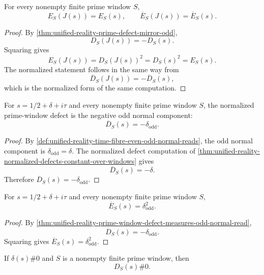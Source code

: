 \begin{theorem}
\label{thm:unified-reality-defect-energy-mirror-even}
For every nonempty finite prime window $S$,
$$
E_S(J(s))=E_S(s),
\qquad
\overline E_S(J(s))=\overline E_S(s).
$$
\end{theorem}

\begin{proof}
By \autoref{thm:unified-reality-prime-defect-mirror-odd},
$$
D_S(J(s))=-D_S(s).
$$
Squaring gives
$$
E_S(J(s))=D_S(J(s))^2=D_S(s)^2=E_S(s).
$$
The normalized statement follows in the same way from
$$
\overline D_S(J(s))=-\overline D_S(s),
$$
which is the normalized form of the same computation.
\end{proof}

\begin{theorem}
\label{thm:unified-reality-prime-window-defect-measures-odd-normal-read}
For $s=1/2+\delta+i\tau$ and every nonempty finite prime window $S$,
the normalized prime-window defect is the negative odd normal component:
$$
\overline D_S(s)=-\delta_{\mathrm{odd}}.
$$
\end{theorem}

\begin{proof}
By
\autoref{def:unified-reality-time-fibre-even-odd-normal-reads}, the odd
normal component is $\delta_{\mathrm{odd}}=\delta$.  The normalized
defect computation of
\autoref{thm:unified-reality-normalized-defects-constant-over-windows}
gives
$$
\overline D_S(s)=-\delta.
$$
Therefore $\overline D_S(s)=-\delta_{\mathrm{odd}}$.
\end{proof}

\begin{corollary}
\label{cor:unified-reality-normalized-defect-energy-squared-odd-read}
For $s=1/2+\delta+i\tau$ and every nonempty finite prime window $S$,
$$
\overline E_S(s)=\delta_{\mathrm{odd}}^2.
$$
\end{corollary}

\begin{proof}
By
\autoref{thm:unified-reality-prime-window-defect-measures-odd-normal-read},
$$
\overline D_S(s)=-\delta_{\mathrm{odd}}.
$$
Squaring gives $\overline E_S(s)=\delta_{\mathrm{odd}}^2$.
\end{proof}

\begin{corollary}
\label{cor:unified-reality-prime-sieve-windows-separate-nonfixed}
If $\delta(s)\#0$ and $S$ is a nonempty finite prime window, then
$$
D_S(s)\#0.
$$
\end{corollary}

